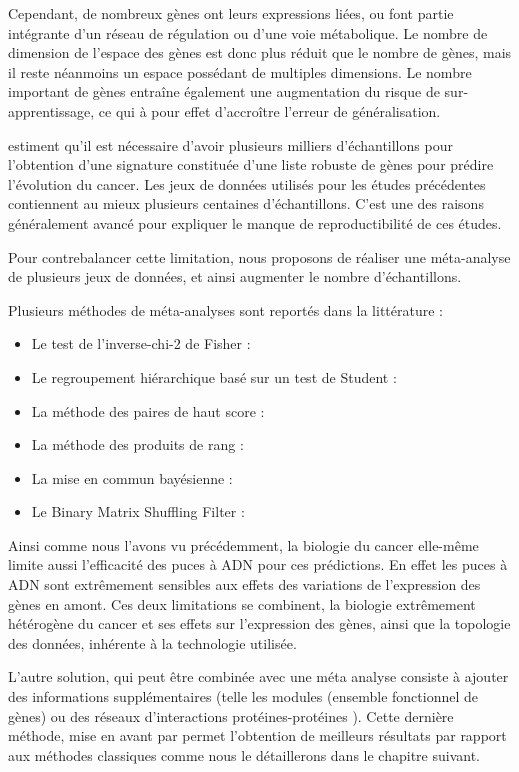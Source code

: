 			Cependant, de nombreux gènes ont leurs expressions liées, ou font partie intégrante d'un réseau de régulation ou d'une voie métabolique.
			Le nombre de dimension de l'espace des gènes est donc plus réduit que le nombre de gènes, mais il reste néanmoins un espace possédant de multiples dimensions.
			Le nombre important de gènes entraîne également une augmentation du risque de sur-apprentissage, ce qui à pour effet d'accroître l'erreur de généralisation.

			\citeauthor{EinDor2006} estiment qu'il est nécessaire d'avoir plusieurs milliers d'échantillons pour l'obtention d'une signature constituée d'une liste robuste de gènes pour prédire l'évolution du cancer.
			Les jeux de données utilisés pour les études précédentes \citep{vandevijver2002,Wang2005} contiennent au mieux plusieurs centaines d'échantillons.
			C'est une des raisons généralement avancé pour expliquer le manque de reproductibilité de ces études.

			Pour contrebalancer cette limitation, nous proposons de réaliser une méta-analyse de plusieurs jeux de données, et ainsi augmenter le nombre d'échantillons.

			Plusieurs méthodes de méta-analyses sont reportés dans la littérature :
			\begin{itemize}
				\item Le test de l'inverse-chi-2 de Fisher : \citet{Fisher1925}
				\item Le regroupement hiérarchique basé sur un test de Student : \citet{Gentleman2004}
				\item La méthode des paires de haut score : \citet{Xu2005}
				\item La méthode des produits de rang : \citet{Hong2006}
				\item La mise en commun bayésienne : \citet{Conlon2006}
				\item Le Binary Matrix Shuffling Filter : \citet{Zhang2012e}
			\end{itemize}

			Ainsi comme nous l'avons vu précédemment, la biologie du cancer elle-même limite aussi l'efficacité des puces à \acs{ADN} pour ces prédictions.
			En effet les puces à \acs{ADN} sont extrêmement sensibles aux effets des variations de l'expression des gènes en amont.
			Ces deux limitations se combinent, la biologie extrêmement hétérogène du cancer et ses effets sur l'expression des gènes, ainsi que la topologie des données, inhérente à la technologie utilisée.

			L'autre solution, qui peut être combinée avec une méta analyse consiste à ajouter des informations supplémentaires (telle les modules (ensemble fonctionnel de gènes) \citep{VanVliet2007} ou des réseaux d'interactions protéines-protéines \citep{Chuang2007}).
			Cette dernière méthode, mise en avant par \citeauthor{Chuang2007} permet l'obtention de meilleurs résultats par rapport aux méthodes classiques comme nous le détaillerons dans le chapitre suivant.

